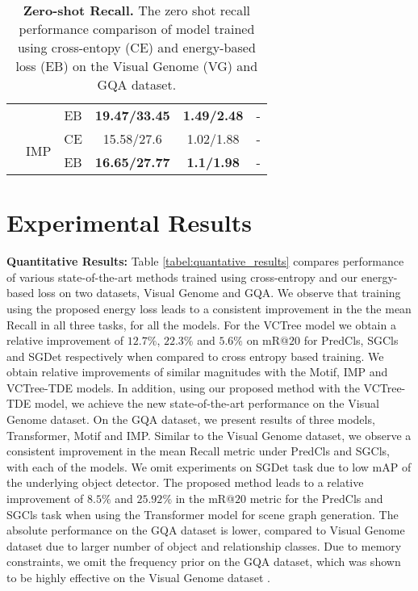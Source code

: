 \documentclass[final]{cvpr}
\begin{document}
\begin{table}[t]
{\begin{tabular}{@{}cccccc@{}}
                               &                              & EB & \textbf{19.47/33.45} & \textbf{1.49/2.48} & -                  \\ \cmidrule(l){2-6} 
                               & \multirow{2}{*}{IMP}         & CE  & 15.58/27.6           & 1.02/1.88          & -                  \\
                               &                              & EB & \textbf{16.65/27.77} & \textbf{1.1/1.98}  & -                  \\ \bottomrule \bottomrule
\end{tabular}
}
\caption{\textbf{Zero-shot Recall.} The zero shot recall performance comparison of model trained using cross-entopy (CE) and energy-based loss (EB) on the Visual Genome (VG) and GQA dataset.}
\label{table:zeroshot}
\vspace{-0.1in}
\end{table}

\section{Experimental Results}

\noindent
{\bf Quantitative Results:}  
Table \ref{tabel:quantative_results} compares performance of various state-of-the-art methods trained using cross-entropy and our energy-based loss on two datasets, Visual Genome and GQA. 
We observe that training using the proposed energy loss leads to a consistent improvement in the the mean Recall in all three tasks, for all the models. For the VCTree model we obtain a relative improvement of $12.7 \%$, $22.3\%$ and $5.6\%$ on mR@$20$ for PredCls, SGCls and SGDet respectively when compared to cross entropy based training. We obtain relative improvements of similar magnitudes with the Motif, IMP and VCTree-TDE models. In addition, using our proposed method with the VCTree-TDE \cite{tang2020unbiased} model, we achieve the new state-of-the-art performance on the Visual Genome dataset. On the GQA dataset, we present results of three models, Transformer, Motif and IMP. Similar to the Visual Genome dataset, we observe a consistent improvement in the mean Recall metric under PredCls and SGCls, with each of the models. We omit experiments on SGDet task due to low mAP of the underlying object detector. The proposed method leads to a relative improvement of $8.5\%$ and $25.92\%$ in the mR@$20$ metric for the PredCls and SGCls task when using the Transformer model for scene graph generation. 
The absolute performance on the GQA dataset is lower, compared to Visual Genome dataset due to larger number of object and relationship classes.
Due to memory constraints, we omit the frequency prior on the GQA dataset, which was shown to be highly effective on the Visual Genome dataset \cite{zellers2018neural}. 
\end{document}
